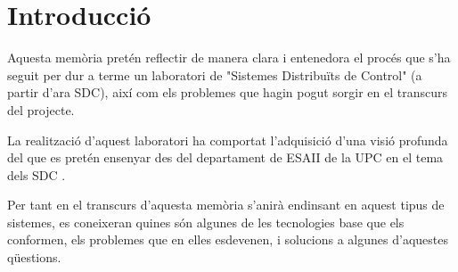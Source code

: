 

\chapter{Introducció}\label{cap:int}

\ifpdf
    \graphicspath{{1_introduction/figures/PNG/}{1_introduction/figures/PDF/}{1_introduction/figures/}}
\else
    \graphicspath{{1_introduction/figures/EPS/}{1_introduction/figures/}}
\fi





Aquesta memòria pretén reflectir de manera clara i entenedora el procés que s'ha seguit per dur a terme un laboratori de "Sistemes Distribuïts de Control" (a partir d'ara SDC), així com els problemes que hagin pogut sorgir en el transcurs del projecte.

La realització d'aquest laboratori ha comportat l'adquisició d'una visió profunda del que es pretén ensenyar des del departament de ESAII  de la UPC en el tema dels SDC .

Per tant en el transcurs d'aquesta memòria s'anirà endinsant en aquest tipus de sistemes, es coneixeran quines són algunes de les tecnologies base que els conformen, els problemes que en elles esdevenen, i solucions a algunes d'aquestes qüestions.

